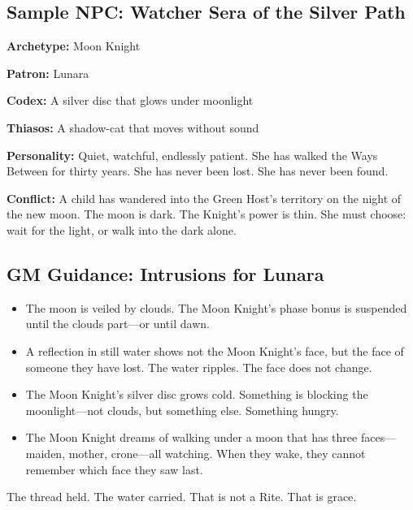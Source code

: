 \subsection{Sample NPC: Watcher Sera of the Silver Path}

\textbf{Archetype:} Moon Knight

\textbf{Patron:} Lunara

\textbf{Codex:} A silver disc that glows under moonlight

\textbf{Thiasos:} A shadow-cat that moves without sound

\textbf{Personality:} Quiet, watchful, endlessly patient. She has walked the Ways Between for thirty years. She has never been lost. She has never been found.

\textbf{Conflict:} A child has wandered into the Green Host's territory on the night of the new moon. The moon is dark. The Knight's power is thin. She must choose: wait for the light, or walk into the dark alone.

\subsection{GM Guidance: Intrusions for Lunara}

\begin{itemize}
\item The moon is veiled by clouds. The Moon Knight's phase bonus is suspended until the clouds part—or until dawn.
\item A reflection in still water shows not the Moon Knight's face, but the face of someone they have lost. The water ripples. The face does not change.
\item The Moon Knight's silver disc grows cold. Something is blocking the moonlight—not clouds, but something else. Something hungry.
\item The Moon Knight dreams of walking under a moon that has three faces—maiden, mother, crone—all watching. When they wake, they cannot remember which face they saw last.
\end{itemize}

The thread held. The water carried. That is not a Rite. That is grace.
